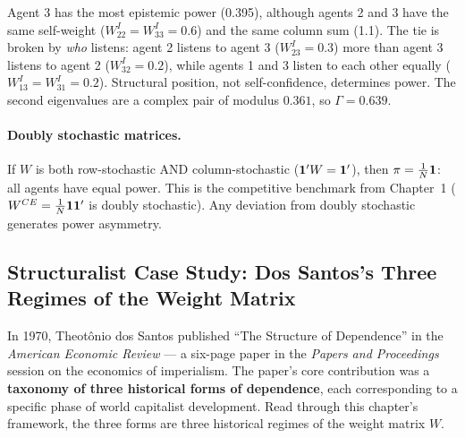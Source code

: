 \documentclass[../structural_economics_book.tex]{subfiles}
\begin{document}
Agent 3 has the most epistemic power (0.395), although agents 2 and 3 have the same self-weight ($W^I_{22} = W^I_{33} = 0.6$) and the same column sum (1.1). The tie is broken by \textit{who} listens: agent 2 listens to agent 3 ($W^I_{23} = 0.3$) more than agent 3 listens to agent 2 ($W^I_{32} = 0.2$), while agents 1 and 3 listen to each other equally ($W^I_{13} = W^I_{31} = 0.2$). Structural position, not self-confidence, determines power. The second eigenvalues are a complex pair of modulus $0.361$, so $\Gamma = 0.639$.

\paragraph{Doubly stochastic matrices.} If $W$ is both row-stochastic AND column-stochastic ($\mathbf{1}'W = \mathbf{1}'$), then $\pi = \frac{1}{N}\mathbf{1}$: all agents have equal power. This is the competitive benchmark from Chapter~1 ($W^{CE} = \frac{1}{N}\mathbf{1}\mathbf{1}'$ is doubly stochastic). Any deviation from doubly stochastic generates power asymmetry.



\subsection*{Structuralist Case Study: Dos Santos's Three Regimes of the Weight Matrix}

In 1970, Theot\^{o}nio dos Santos published ``The Structure of Dependence'' in the \textit{American Economic Review} --- a six-page paper in the \textit{Papers and Proceedings} session on the economics of imperialism. The paper's core contribution was a \textbf{taxonomy of three historical forms of dependence}, each corresponding to a specific phase of world capitalist development. Read through this chapter's framework, the three forms are three historical regimes of the weight matrix $W$.
\end{document}
